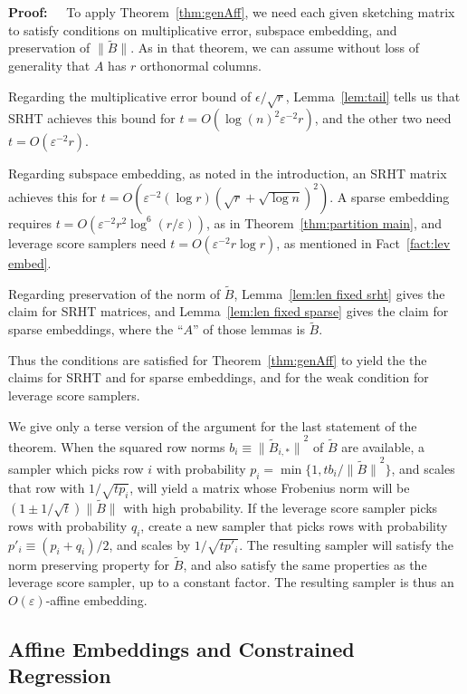 \documentclass{sig-alternate}
\newcommand{\norm}[1]{{\| #1 \|}}
\newcommand{\eps}{\varepsilon}
\def\FullBox{\hbox{\vrule width 8pt height 8pt depth 0pt}}
\def\qed{\ifmmode\qquad\FullBox\else{\unskip\nobreak\hfil
\penalty50\hskip1em\null\nobreak\hfil\FullBox
\parfillskip=0pt\finalhyphendemerits=0\endgraf}\fi}
\newenvironment{proof}{\begin{trivlist} \item {\bf Proof:~~}}
  {\qed\end{trivlist}}
\begin{document}
\begin{proof}
To apply Theorem~\ref{thm:genAff}, we need each given sketching matrix
to satisfy conditions on multiplicative error, subspace embedding, and
preservation of $\norm{\tilde B}$. As in that theorem, we can
assume without loss of generality that $A$ has $r$ orthonormal columns.

Regarding the multiplicative error bound of $\epsilon/\sqrt{r}$,
Lemma~\ref{lem:tail} tells us that SRHT achieves this bound for $t=O(\log(n)^2 \eps^{-2}r)$,
and the other two need $t=O(\eps^{-2}r)$.

Regarding subspace embedding, as noted in the introduction,
an SRHT matrix achieves this
for $t = O(\eps^{-2} (\log r)(\sqrt{r}+\sqrt{\log n})^2)$.
A sparse embedding requires $t=O(\eps^{-2}r^2\log^6(r/\eps))$,
as in Theorem~\ref{thm:partition main}, and leverage score samplers
need $t=O(\eps^{-2} r\log r)$, as mentioned in Fact~\ref{fact:lev embed}.

Regarding preservation of the norm of $\tilde B$, Lemma~\ref{lem:len fixed srht}
gives the claim for SRHT matrices, and Lemma~\ref{lem:len fixed sparse} gives the claim for
sparse embeddings, where the ``$A$'' of those lemmas
is $\tilde B$.


Thus the conditions are satisfied for Theorem~\ref{thm:genAff}
to yield the the claims for SRHT and for sparse embeddings, and for the weak condition
for leverage score samplers.

We give only a terse version of the argument for the last statement of
the theorem.
When the squared row norms $b_i \equiv \norm{\tilde B_{i,*}}^2$ of $\tilde B$ are available,
a sampler which picks row $i$ with probability $p_i = \min\{1, t b_i/\norm{\tilde B}^2\}$,
and scales that row with $1/\sqrt{tp_i}$, will yield a matrix whose
Frobenius norm will be $(1\pm 1/\sqrt{t})\norm{\tilde B}$ with high probability.
If the leverage score sampler picks rows with probability $q_i$,
create a new sampler that picks rows with probability $p'_i \equiv (p_i + q_i)/2$,
and scales by $1/\sqrt{t p'_i}$. The resulting sampler will satisfy
the norm preserving property for $\tilde B$, and also
satisfy the same properties as the leverage score sampler, up to a constant
factor. The resulting sampler is thus an $O(\eps)$-affine embedding.
\end{proof}


\subsection{Affine Embeddings and Constrained Regression}\label{subsec:constrained}
\end{document}
